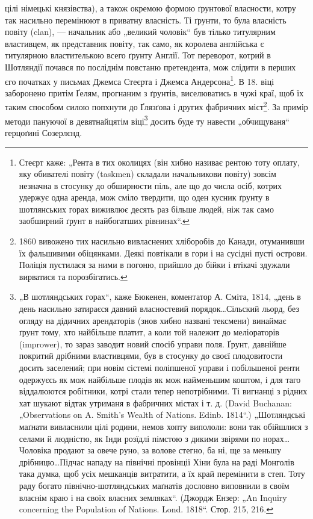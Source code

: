 \parcont{}
цілі німецькі князівства), а також окремою формою ґрунтової власности, котру так насильно перемінюют
в приватну власність. Ті ґрунти, то була власність повіту (clan), — начальник або „великий чоловік“
був тілько титулярним властивцем, як представник повіту, так само, як королева англійська є
титулярною властителькою всего ґрунту Англії. Тот переворот, котрий в Шотляндії почався по посліднім
повстаню претендента, мож слідити в перших єго початках у письмах Джемса Стеєрта і Джемса Андерсона\footnote{
Стеєрт каже: „Рента в тих околицях (він хибно називає рентою тоту оплату, яку обивателі повіту
(taskmen) складали начальникови повіту) зовсім незначна в стосунку до обширности піль, але що до
числа осіб, котрих удержує одна аренда, мож сміло твердити, що оден кусник ґрунту в шотлянських
горах виживлює десять раз більше людей, ніж так само заобширний ґрунт в найбогатших рівнинах“.
}. В 18. віці заборонено притім Ґелям, прогнаним з ґрунтів, виселюватись в чужі краї, щоб їх таким
способом силою попхнути до Ґлязґова і других фабричних міст\footnote{
1860 вивожено тих насильно вивласнених хліборобів до Канади, отуманивши їх фальшивими
обіцянками. Деякі повтікали в гори і на сусідні пусті острови. Поліція пустилася за ними в погоню,
прийшло до бійки і втікачі здужали вирватися та порозбігатись.
}. За примір
методи пануючої в девятнайцятім віці\footnote{
„В шотляндських горах“, каже Бюкенен, коментатор А. Сміта, 1814, „день в день насильно затираєся
давний власностевий порядок\dots Сільский льорд, без огляду на дідичних арендаторів (знов хибно
названі тексмени) винаймає ґрунт тому, хто найбільше платит, а коли той належит до меліораторів
(imprower), то зараз заводит новий спосіб управи поля. Ґрунт, давнійше покритий дрібними
властивцями, був в стосунку до своєї плодовитости досить заселений; при новім сістемі поліпшеної
управи і побільшеної ренти одержуєсь як мож найбільше плодів як мож найменьшим коштом, і для таго
віддалюются робітники, котрі стали тепер непотрібними. Ті вигнанці з рідних хат шукают відтак
утриманя в фабричних містах і т. д. (David Buchanan: „Observations on A. Smith’s Wealth of Nations.
Edinb. 1814“.) „Шотляндські маґнати вивласнили цілі родини, немов хопту випололи: вони так обійшлися
з селами й людністю, як Інди розїдлі пімстою з дикими звірями по норах\dots Чоловіка продают
за овече руно, за волове стегно, ба ні, ще за меньшу дрібницю\dots Підчас нападу на північні
провінції Хіни була на раді Монголів така думка, щоб усіх мешканців витратити, а їх край перемінити
в степ. Тоту раду богато північно-шотляндських маґнатів дословно виповнили в своїм власнім краю і на
своїх власних земляках“. (Джордж Ензер: „An Inquiry concerning the Population of Nations. Lond.
1818“. Стор. 215, 216.
} досить буде ту навести „обчищуваня“ герцоґині Созерлєнд.
